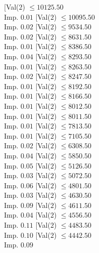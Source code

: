 \documentclass[margin=10pt]{standalone}
\begin{document}
\begin{forest}
																	[Label: " >50K"]
																	[Val($2$) $ \leq 10125.50$ \\ Imp. $0.01$
																		[Val($2$) $ \leq 10095.50$ \\ Imp. $0.02$
																			[Val($2$) $ \leq 9534.50$ \\ Imp. $0.02$
																				[Val($2$) $ \leq 8631.50$ \\ Imp. $0.01$
																					[Val($2$) $ \leq 8386.50$ \\ Imp. $0.04$
																						[Val($2$) $ \leq 8293.50$ \\ Imp. $0.01$
																							[Val($2$) $ \leq 8263.50$ \\ Imp. $0.02$
																								[Val($2$) $ \leq 8247.50$ \\ Imp. $0.01$
																									[Val($2$) $ \leq 8192.50$ \\ Imp. $0.01$
																										[Val($2$) $ \leq 8166.50$ \\ Imp. $0.01$
																											[Val($2$) $ \leq 8012.50$ \\ Imp. $0.01$
																												[Val($2$) $ \leq 8011.50$ \\ Imp. $0.01$
																													[Val($2$) $ \leq 7813.50$ \\ Imp. $0.01$
																														[Val($2$) $ \leq 7105.50$ \\ Imp. $0.02$
																															[Val($2$) $ \leq 6308.50$ \\ Imp. $0.04$
																																[Val($2$) $ \leq 5850.50$ \\ Imp. $0.05$
																																	[Val($2$) $ \leq 5126.50$ \\ Imp. $0.03$
																																		[Val($2$) $ \leq 5072.50$ \\ Imp. $0.06$
																																			[Val($2$) $ \leq 4801.50$ \\ Imp. $0.03$
																																				[Val($2$) $ \leq 4630.50$ \\ Imp. $0.09$
																																					[Val($2$) $ \leq 4611.50$ \\ Imp. $0.04$
																																						[Val($2$) $ \leq 4556.50$ \\ Imp. $0.11$
																																							[Val($2$) $ \leq 4483.50$ \\ Imp. $0.10$
																																								[Val($2$) $ \leq 4442.50$ \\ Imp. $0.09$

\end{forest}
\end{document}
